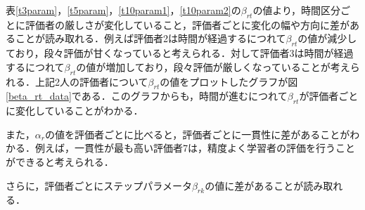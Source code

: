 \documentclass[a4paper,11pt,oneside,openany]{jsbook}
\begin{document}
表\ref{t3param}，\ref{t5param}，\ref{t10param1}，\ref{t10param2}の$\beta_{rt}$の値より，時間区分ごとに評価者の厳しさが変化していること，評価者ごとに変化の幅や方向に差があることが読み取れる．例えば評価者2は時間が経過するにつれて$\beta_{rt}$の値が減少しており，段々評価が甘くなっていると考えられる．対して評価者3は時間が経過するにつれて$\beta_{rt}$の値が増加しており，段々評価が厳しくなっていることが考えられる．上記2人の評価者について$\beta_{rt}$の値をプロットしたグラフが図\ref{beta_rt_data}である．このグラフからも，時間が進むにつれて$\beta_{rt}$が評価者ごとに変化していることがわかる．

また，$\alpha_r$の値を評価者ごとに比べると，評価者ごとに一貫性に差があることがわかる．例えば，一貫性が最も高い評価者7は，精度よく学習者の評価を行うことができると考えられる．

さらに，評価者ごとにステップパラメータ$\beta_{rk}$の値に差があることが読み取れる．
\end{document}
